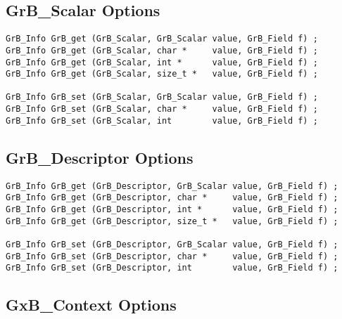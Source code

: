 \subsection{{\sf GrB\_Scalar} Options}
\label{get_set_scalar}

\begin{mdframed}[userdefinedwidth=6in]
{\footnotesize
\begin{verbatim}
GrB_Info GrB_get (GrB_Scalar, GrB_Scalar value, GrB_Field f) ;
GrB_Info GrB_get (GrB_Scalar, char *     value, GrB_Field f) ;
GrB_Info GrB_get (GrB_Scalar, int *      value, GrB_Field f) ;
GrB_Info GrB_get (GrB_Scalar, size_t *   value, GrB_Field f) ;

GrB_Info GrB_set (GrB_Scalar, GrB_Scalar value, GrB_Field f) ;
GrB_Info GrB_set (GrB_Scalar, char *     value, GrB_Field f) ;
GrB_Info GrB_set (GrB_Scalar, int        value, GrB_Field f) ;
\end{verbatim}
}\end{mdframed}

\subsection{{\sf GrB\_Descriptor} Options}
\label{get_set_descriptor}

\begin{mdframed}[userdefinedwidth=6in]
{\footnotesize
\begin{verbatim}
GrB_Info GrB_get (GrB_Descriptor, GrB_Scalar value, GrB_Field f) ;
GrB_Info GrB_get (GrB_Descriptor, char *     value, GrB_Field f) ;
GrB_Info GrB_get (GrB_Descriptor, int *      value, GrB_Field f) ;
GrB_Info GrB_get (GrB_Descriptor, size_t *   value, GrB_Field f) ;

GrB_Info GrB_set (GrB_Descriptor, GrB_Scalar value, GrB_Field f) ;
GrB_Info GrB_set (GrB_Descriptor, char *     value, GrB_Field f) ;
GrB_Info GrB_set (GrB_Descriptor, int        value, GrB_Field f) ;
\end{verbatim}
}\end{mdframed}

\subsection{{\sf GxB\_Context} Options}
\label{get_set_context}

